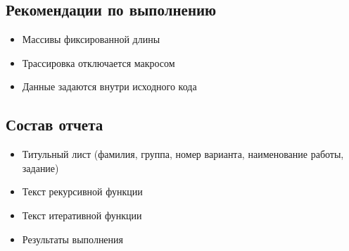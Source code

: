 \documentclass[a4paper,12pt]{article}
\begin{document}
\subsection{Рекомендации по выполнению}
\begin{itemize}
	\item Массивы фиксированной длины
	\item Трассировка отключается макросом
	\item Данные задаются внутри исходного кода
\end{itemize}

\subsection{Состав отчета}
\begin{itemize}
	\item Титульный лист (фамилия, группа, номер варианта, наименование работы, задание)
	\item Текст рекурсивной функции
	\item Текст итеративной функции
	\item Результаты выполнения
\end{itemize}
\end{document}
